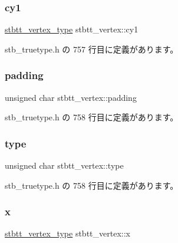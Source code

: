 \mbox{\label{structstbtt__vertex_a68227d28643f5667064fa3c385f4ea7d}} 
\subsubsection{\texorpdfstring{cy1}{cy1}}
{\footnotesize\ttfamily \mbox{\hyperlink{stb__truetype_8h_ab8fd8e5e0b82b0f7da54532035e47b22}{stbtt\+\_\+vertex\+\_\+type}} stbtt\+\_\+vertex\+::cy1}



 stb\+\_\+truetype.\+h の 757 行目に定義があります。

\mbox{\label{structstbtt__vertex_a8bd328747e8ea018612960a52e3e3ede}} 
\subsubsection{\texorpdfstring{padding}{padding}}
{\footnotesize\ttfamily unsigned char stbtt\+\_\+vertex\+::padding}



 stb\+\_\+truetype.\+h の 758 行目に定義があります。

\mbox{\label{structstbtt__vertex_aa325b3707b88e7e104c0de46bb2bf395}} 
\subsubsection{\texorpdfstring{type}{type}}
{\footnotesize\ttfamily unsigned char stbtt\+\_\+vertex\+::type}



 stb\+\_\+truetype.\+h の 758 行目に定義があります。

\mbox{\label{structstbtt__vertex_a81773edbe760d0e090561a3c1e86c919}} 
\subsubsection{\texorpdfstring{x}{x}}
{\footnotesize\ttfamily \mbox{\hyperlink{stb__truetype_8h_ab8fd8e5e0b82b0f7da54532035e47b22}{stbtt\+\_\+vertex\+\_\+type}} stbtt\+\_\+vertex\+::x}



